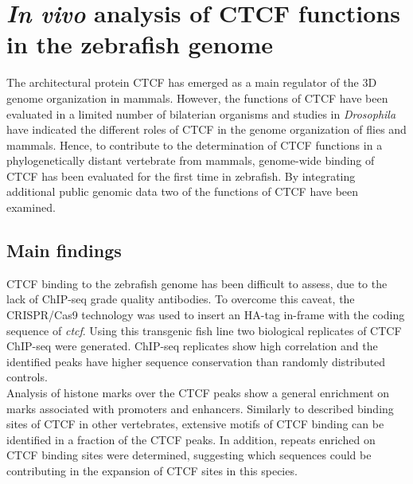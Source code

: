 		

		

		

	\section{\textit{In vivo} analysis of CTCF functions in the zebrafish genome}

		The architectural protein CTCF has emerged as a main regulator of the 3D genome organization in mammals. However, the functions of CTCF have been evaluated in a limited number of bilaterian organisms and studies in \textit{Drosophila} have indicated the different roles of CTCF in the genome organization of flies and mammals. Hence, to contribute to the determination of CTCF functions in a phylogenetically distant vertebrate from mammals, genome-wide binding of CTCF has been evaluated for the first time in zebrafish. By integrating additional public genomic data two of the functions of CTCF have been examined.\\ 

		\subsection{Main findings}

			CTCF binding to the zebrafish genome has been difficult to assess, due to the lack of ChIP-seq grade quality antibodies. To overcome this caveat, the CRISPR/Cas9 technology was used to insert an HA-tag in-frame with the coding sequence of \textit{ctcf}. Using this transgenic fish line two biological replicates of CTCF ChIP-seq were generated. ChIP-seq replicates show high correlation and the identified peaks have higher sequence conservation than randomly distributed controls.\\

			Analysis of histone marks over the CTCF peaks show a general enrichment on marks associated with promoters and enhancers. Similarly to described binding sites of CTCF in other vertebrates, extensive motifs of CTCF binding can be identified in a fraction of the CTCF peaks. In addition, repeats enriched on CTCF binding sites were determined, suggesting which sequences could be contributing in the expansion of CTCF sites in this species.\\

